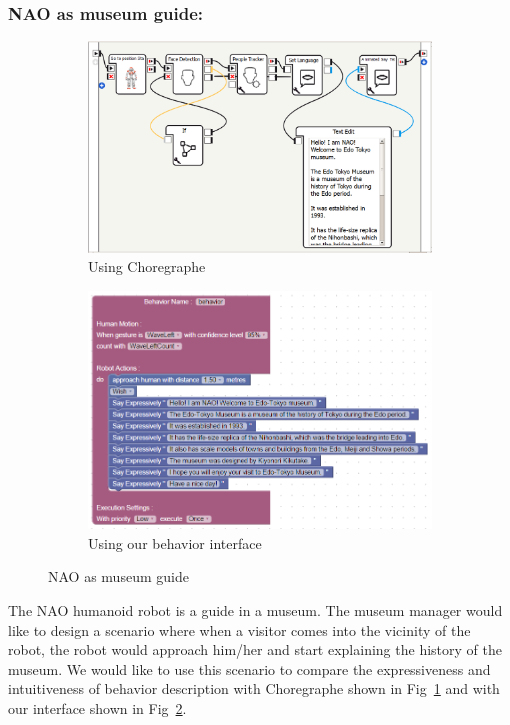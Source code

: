 \documentclass{llncs}
\begin{document}
\subsubsection{NAO as museum guide: }
\begin{figure}
\centering
\begin{subfigure}[t]{0.49\textwidth}
\includegraphics[width=\textwidth]{../thesis/assets/scenario_museum_choregraphe2.png}
\caption[Using Choregraphe]{Using Choregraphe}
\label{fig:scenario1_program_choregraphe}
\end{subfigure}
\begin{subfigure}[t]{0.49\textwidth}
\includegraphics[width=\textwidth]{../thesis/assets/scenario1.png}
\caption[Using our behavior interface]{Using our behavior interface}
\label{fig:scenario1_program}
\end{subfigure}
\caption[NAO as museum guide]{NAO as museum guide}
\label{fig:scenarios}
\end{figure}
	The NAO humanoid robot is a guide in a museum. The museum manager would like to design a scenario where when a visitor comes into the vicinity of the robot, the robot would approach him/her and start explaining the history of the museum. We would like to use this scenario to compare the expressiveness and intuitiveness of behavior description with Choregraphe \cite{NaoRobot} shown in Fig~\ref{fig:scenario1_program_choregraphe} and with our interface shown in Fig~\ref{fig:scenario1_program}.
	
\end{document}
